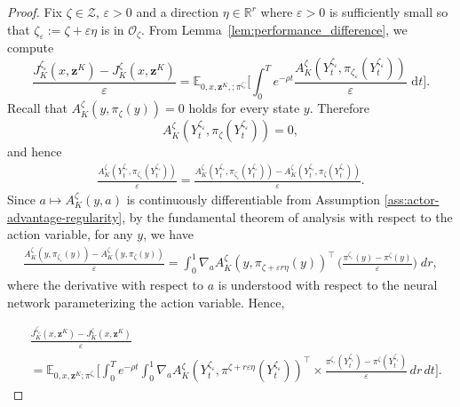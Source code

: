 \documentclass[11pt]{article}
\theoremstyle{remarkitalic}
\theoremstyle{remarkitalic}
\newcommand{\R}{\mathbb R}
\newcommand{\E}{\mathbb E}
\newcommand{\dd}{\,\mathrm d}
\newcommand{\1}{\mathbf 1}
\begin{document}
\begin{proof}
Fix $\zeta\in\mathcal{Z}$, $\varepsilon>0$ and a direction $\eta\in\R^r$ where $\varepsilon>0$ is sufficiently small so that $\zeta_\varepsilon:=\zeta+\varepsilon\eta$ is in $ \mathcal O_\zeta$.
From Lemma~\ref{lem:performance_difference}, we compute
\begin{equation}\label{eq:diffquotient}
    \frac{J_K^{\zeta_\varepsilon}(x,\mathbf{z}^K)-J_K^\zeta(x,\mathbf{z}^K)}{\varepsilon}
    =
    \E_{0,x,\mathbf{z}^K,;\pi^{\zeta_\varepsilon}}\Big[
    \int_0^T e^{-\rho t}
    \frac{
        A_K^\zeta(Y_t^{\zeta_\varepsilon},
        \pi_{\zeta_\varepsilon}(Y_t^{\zeta_\varepsilon}))
    }{\varepsilon}
    \,\dd t\Big].
\end{equation}
Recall that $A_K^\zeta(y,\pi_\zeta(y))=0$
holds for every state $y$. Therefore
\[
    A_K^\zeta(Y_t^{\zeta_\varepsilon},
    \pi_\zeta(Y_t^{\zeta_\varepsilon}))=0,
\]
and hence
\[
\begin{aligned}
\frac{
        A_K^\zeta(Y_t^{\zeta_\varepsilon},
        \pi_{\zeta_\varepsilon}(Y_t^{\zeta_\varepsilon}))
    }{\varepsilon}=
    \frac{
        A_K^\zeta(Y_t^{\zeta_\varepsilon},
        \pi_{\zeta_\varepsilon}(Y_t^{\zeta_\varepsilon}))
        -
        A_K^\zeta(Y_t^{\zeta_\varepsilon},
        \pi_\zeta(Y_t^{\zeta_\varepsilon}))
    }{\varepsilon}.
\end{aligned}
\]
Since $a\longmapsto A_K^\zeta(y,a)$ is continuously differentiable from Assumption \ref{ass:actor-advantage-regularity}, by the fundamental theorem of analysis with respect to the action variable, for any $y$, we have
\[
\begin{aligned}
    \frac{
        A_K^\zeta(y,\pi_{\zeta_\varepsilon}(y))
        -
        A_K^\zeta(y,\pi_\zeta(y))
    }{\varepsilon} = \int_0^1 
    \nabla_a A_K^\zeta(y, \pi_{\zeta+\varepsilon r \eta}(y))^\top \,\Big(
   \frac{
\pi^{\zeta_\varepsilon}(y)-\pi^\zeta(y)
}{\varepsilon}\Big) \; dr,
\end{aligned}
\]
where the derivative with respect to $a$ is understood with respect to the neural network parameterizing the action variable. Hence,


\begin{align*}
&
\frac{J^{\zeta_\varepsilon}_K(x,\mathbf{z}^K)-J^\zeta_K(x,\mathbf{z}^K)}{\varepsilon}\\
&=
\mathbb{E}_{0,x,\mathbf{z}^K;\pi^{\zeta_\varepsilon}}
\Bigg[
\int_0^T
e^{-\rho t}
\int_0^1
\nabla_aA^\zeta_K
\!\left(
Y_t^{\zeta_\varepsilon},
\pi^{\zeta+r\varepsilon\eta}
(Y_t^{\zeta_\varepsilon})
\right)^\top\times
\frac{
\pi^{\zeta_\varepsilon}(Y_t^{\zeta_\varepsilon})
-
\pi^\zeta(Y_t^{\zeta_\varepsilon})
}{\varepsilon}
\,dr\,dt
\Bigg].
\end{align*}


\end{proof}
\end{document}
